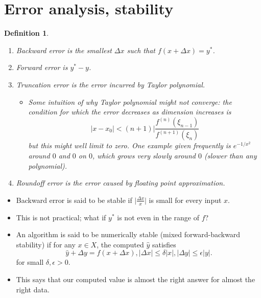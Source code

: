 \documentclass[11pt,reqno]{amsart}
\newtheorem{definition}{Definition}
\theoremstyle{remark}
\begin{document}
\section{Error analysis, stability}
\begin{definition}
\begin{enumerate}
\item Backward error is the smallest $\Delta x$ such that $f(x+\Delta x)=y^*$. 
\item Forward error is $y^*-y$.
\item Truncation error is the error incurred by Taylor polynomial. 
\begin{itemize}
\item Some intuition of why Taylor polynomial might not converge: the condition for which the error decreases as dimension increases is  
\[
  \lvert x-x_0\rvert<(n+1)\lvert\frac{f^{(n)}
(\xi_{n-1})}{f^{(n+1)}(\xi_n)}
\]
but this might well limit to zero. One example given frequently is $e^{-1/x^2}$ around $0$ and $0$ on $0$, which grows very slowly 
around $0$ (slower than any polynomial).
\end{itemize}
\item Roundoff error is the error caused by floating point approximation.
\end{enumerate}
\end{definition}
\begin{itemize}
\item Backward error is said to be stable if $\lvert\frac{\Delta x}{x}\rvert$ is small for every input $x$. 
\item This is not practical; what if $y^*$ is not even in the range of $f$?
\item An algorithm is said to be numerically stable (mixed forward-backward stability) if 
for any $x\in X$, the computed $\hat y$ satisfies
\[
\hat y + \Delta y=f(x+\Delta x), \lvert \Delta x\rvert\leq \delta\lvert x\rvert, 
\lvert \Delta y\lvert\leq\epsilon\lvert y\rvert.
\]
for small $\delta, \epsilon>0$.
\item This says that our computed value is almost the right answer for almost the right data.
\end{itemize}
\end{document}
